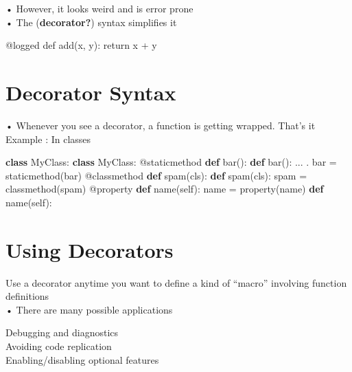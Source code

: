 \documentclass[
  letterpaper,
  DIV=11,
  numbers=noendperiod]{scrreprt}
\newenvironment{Shaded}{\begin{snugshade}}{\end{snugshade}}
\newcommand{\BuiltInTok}[1]{\textcolor[rgb]{0.00,0.23,0.31}{#1}}
\newcommand{\KeywordTok}[1]{\textcolor[rgb]{0.00,0.23,0.31}{\textbf{#1}}}
\newcommand{\NormalTok}[1]{\textcolor[rgb]{0.00,0.23,0.31}{#1}}
\newcommand{\OperatorTok}[1]{\textcolor[rgb]{0.37,0.37,0.37}{#1}}
\newcommand{\VariableTok}[1]{\textcolor[rgb]{0.07,0.07,0.07}{#1}}
\begin{document}
• However, it looks weird and is error prone\\
• The (\textbf{decorator?}) syntax simplifies it

\begin{Shaded}
\begin{Highlighting}[]
\NormalTok{@logged def add(x, y): return x + y }
\end{Highlighting}
\end{Shaded}


\chapter{Decorator Syntax}\label{decorator-syntax-1}

• Whenever you see a decorator, a function is getting wrapped. That's
it\\
Example : In classes

\begin{Shaded}
\begin{Highlighting}[]
\KeywordTok{class}\NormalTok{ MyClass: }\KeywordTok{class}\NormalTok{ MyClass: }\OperatorTok{@}\NormalTok{staticmethod }\KeywordTok{def}\NormalTok{ bar(): }\KeywordTok{def}\NormalTok{ bar(): ... . bar }\OperatorTok{=} \BuiltInTok{staticmethod}\NormalTok{(bar) }\OperatorTok{@}\NormalTok{classmethod }\KeywordTok{def}\NormalTok{ spam(cls): }\KeywordTok{def}\NormalTok{ spam(cls): spam }\OperatorTok{=} \BuiltInTok{classmethod}\NormalTok{(spam) }\OperatorTok{@}\NormalTok{property }\KeywordTok{def}\NormalTok{ name(}\VariableTok{self}\NormalTok{): name }\OperatorTok{=} \BuiltInTok{property}\NormalTok{(name) }\KeywordTok{def}\NormalTok{ name(}\VariableTok{self}\NormalTok{): }
\end{Highlighting}
\end{Shaded}


\chapter{Using Decorators}\label{using-decorators}

Use a decorator anytime you want to define a kind of ``macro'' involving
function definitions\\
• There are many possible applications

Debugging and diagnostics\\
Avoiding code replication\\
Enabling/disabling optional features
\end{document}
